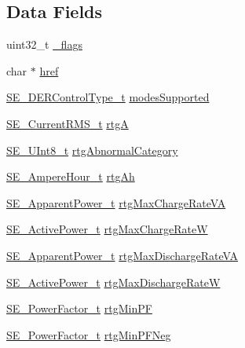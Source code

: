 \subsection*{Data Fields}
\begin{DoxyCompactItemize}
\item 
uint32\+\_\+t \hyperlink{group__DERCapability_ga0f194b8e66999993dad21c45fe22d0c7}{\+\_\+flags}
\item 
char $\ast$ \hyperlink{group__DERCapability_gae473d708806e294b5acbc9e455497af9}{href}
\item 
\hyperlink{group__DERControlType_gae0eefcd49e1cd98d709327c88f20a76b}{S\+E\+\_\+\+D\+E\+R\+Control\+Type\+\_\+t} \hyperlink{group__DERCapability_gaeb2956e3adf1befb4d62ab1e2aa1de5c}{modes\+Supported}
\item 
\hyperlink{structSE__CurrentRMS__t}{S\+E\+\_\+\+Current\+R\+M\+S\+\_\+t} \hyperlink{group__DERCapability_gae76648932f07be5a38c825f934fbe002}{rtgA}
\item 
\hyperlink{group__UInt8_gaf7c365a1acfe204e3a67c16ed44572f5}{S\+E\+\_\+\+U\+Int8\+\_\+t} \hyperlink{group__DERCapability_ga6aee5c16aef59e2683c53aa58c13dee8}{rtg\+Abnormal\+Category}
\item 
\hyperlink{structSE__AmpereHour__t}{S\+E\+\_\+\+Ampere\+Hour\+\_\+t} \hyperlink{group__DERCapability_ga259b7c7654bd92928ea31dac53ebda20}{rtg\+Ah}
\item 
\hyperlink{structSE__ApparentPower__t}{S\+E\+\_\+\+Apparent\+Power\+\_\+t} \hyperlink{group__DERCapability_ga0e2378d8fdea4d48fb51d2f8d5b4b936}{rtg\+Max\+Charge\+Rate\+VA}
\item 
\hyperlink{structSE__ActivePower__t}{S\+E\+\_\+\+Active\+Power\+\_\+t} \hyperlink{group__DERCapability_ga36c8c55fa197038f70f83697f985446d}{rtg\+Max\+Charge\+RateW}
\item 
\hyperlink{structSE__ApparentPower__t}{S\+E\+\_\+\+Apparent\+Power\+\_\+t} \hyperlink{group__DERCapability_ga68954554c11aab995b225b64dcae7501}{rtg\+Max\+Discharge\+Rate\+VA}
\item 
\hyperlink{structSE__ActivePower__t}{S\+E\+\_\+\+Active\+Power\+\_\+t} \hyperlink{group__DERCapability_gaf6967bed463f21a9877a155c994753d2}{rtg\+Max\+Discharge\+RateW}
\item 
\hyperlink{structSE__PowerFactor__t}{S\+E\+\_\+\+Power\+Factor\+\_\+t} \hyperlink{group__DERCapability_ga72727afdb49427d03d3d113d0d2d6bf5}{rtg\+Min\+PF}
\item 
\hyperlink{structSE__PowerFactor__t}{S\+E\+\_\+\+Power\+Factor\+\_\+t} \hyperlink{group__DERCapability_gaebcb9b5c1b7df73c7b4eca49b090d6c3}{rtg\+Min\+P\+F\+Neg}

\end{DoxyCompactItemize}
